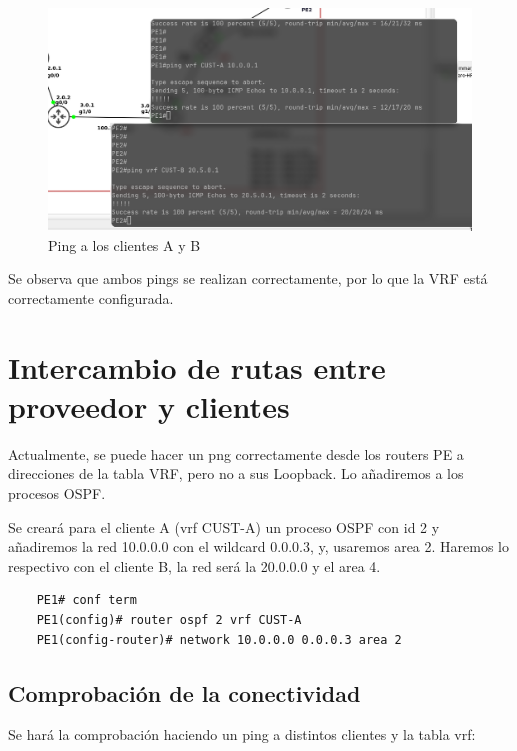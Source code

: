 \documentclass{article}
\begin{document}
\begin{figure}[h]
    \centering
    \includegraphics[width=1\textwidth]{src/pingcust.png}
    \caption{Ping a los clientes A y B}
\end{figure}

Se observa que ambos  pings se realizan correctamente, por lo que la VRF está correctamente configurada.

\section{Intercambio de rutas entre proveedor y clientes}

Actualmente, se puede hacer un png correctamente desde los routers PE a direcciones de la tabla VRF, pero no a sus Loopback. Lo añadiremos a los procesos OSPF.

Se creará para el cliente A (vrf CUST-A) un proceso OSPF con id 2 y añadiremos la red 10.0.0.0 con el wildcard 0.0.0.3, y, usaremos area 2. Haremos lo respectivo con el cliente B, la red será la 20.0.0.0 y el area 4.

\begin{verbatim}
    PE1# conf term
    PE1(config)# router ospf 2 vrf CUST-A
    PE1(config-router)# network 10.0.0.0 0.0.0.3 area 2
\end{verbatim}

\subsection{Comprobación de la conectividad}

Se hará la comprobación haciendo un ping a distintos clientes y la tabla vrf:
\end{document}
